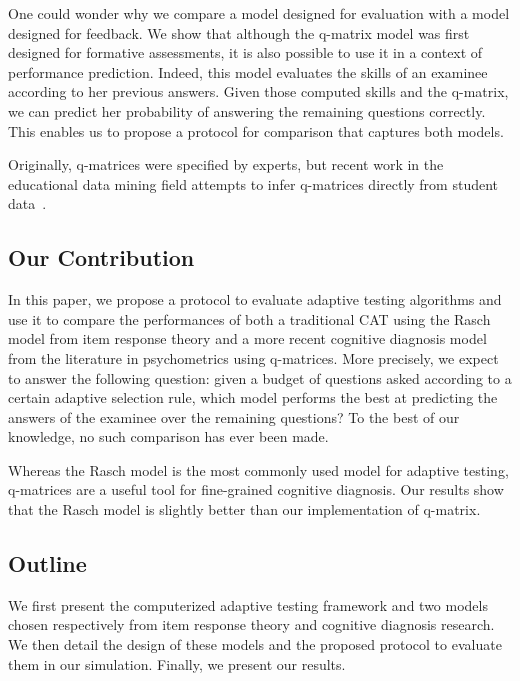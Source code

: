 \documentclass{edm_template}
\begin{document}
One could wonder why we compare a model designed for evaluation with a model designed for feedback. We show that although the q-matrix model was first designed for formative assessments, it is also possible to use it in a context of performance prediction. Indeed, this model evaluates the skills of an examinee according to her previous answers. Given those computed skills and the q-matrix, we can predict her probability of answering the remaining questions correctly. This enables us to propose a protocol for comparison that captures both models.

Originally, q-matrices were specified by experts, but recent work in the educational data mining field attempts to infer q-matrices directly from student data~\cite{Huebner2010}. %

\subsection{Our Contribution}

In this paper, we propose a protocol to evaluate adaptive testing algorithms and use it to compare the performances of both a traditional CAT using the Rasch model from item response theory and a more recent cognitive diagnosis model from the literature in psychometrics using q-matrices. More precisely, we expect to answer the following question: given a budget of questions asked according to a certain adaptive selection rule, which model performs the best at predicting the answers of the examinee over the remaining questions? To the best of our knowledge, no such comparison has ever been made.

Whereas the Rasch model is the most commonly used model for adaptive testing, q-matrices are a useful tool for fine-grained cognitive diagnosis. Our results show that the Rasch model is slightly better than our implementation of q-matrix.

\subsection{Outline}

We first present the computerized adaptive testing framework and two models chosen respectively from item response theory and cognitive diagnosis research. We then detail the design of these models and the proposed protocol to evaluate them in our simulation. Finally, we present our results.
\end{document}
